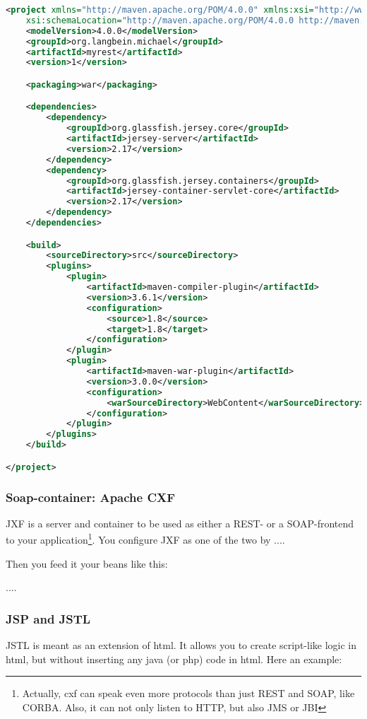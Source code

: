 \begin{lstlisting}[language=xml,title=pom.xml]
<project xmlns="http://maven.apache.org/POM/4.0.0" xmlns:xsi="http://www.w3.org/2001/XMLSchema-instance"
	xsi:schemaLocation="http://maven.apache.org/POM/4.0.0 http://maven.apache.org/xsd/maven-4.0.0.xsd">
	<modelVersion>4.0.0</modelVersion>
	<groupId>org.langbein.michael</groupId>
	<artifactId>myrest</artifactId>
	<version>1</version>

	<packaging>war</packaging>

	<dependencies>
		<dependency>
			<groupId>org.glassfish.jersey.core</groupId>
			<artifactId>jersey-server</artifactId>
			<version>2.17</version>
		</dependency>
		<dependency>
			<groupId>org.glassfish.jersey.containers</groupId>
			<artifactId>jersey-container-servlet-core</artifactId>
			<version>2.17</version>
		</dependency>
	</dependencies>

	<build>
		<sourceDirectory>src</sourceDirectory>
		<plugins>
			<plugin>
				<artifactId>maven-compiler-plugin</artifactId>
				<version>3.6.1</version>
				<configuration>
					<source>1.8</source>
					<target>1.8</target>
				</configuration>
			</plugin>
			<plugin>
				<artifactId>maven-war-plugin</artifactId>
				<version>3.0.0</version>
				<configuration>
					<warSourceDirectory>WebContent</warSourceDirectory>
				</configuration>
			</plugin>
		</plugins>
	</build>

</project>
\end{lstlisting}




\subsubsection{Soap-container: Apache CXF}
JXF is a server and container to be used as either a REST- or a SOAP-frontend to your application\footnote{Actually, cxf can speak even more protocols than just REST and SOAP, like CORBA. Also, it can not only listen to HTTP, but also JMS or JBI}. You configure JXF as one of the two by ....

Then you feed it your beans like this: 

....


\subsubsection{JSP and JSTL}
 
 JSTL is meant as an extension of html. It allows you to create script-like logic in html, but without inserting any java (or php) code in html. Here an example: 
 
